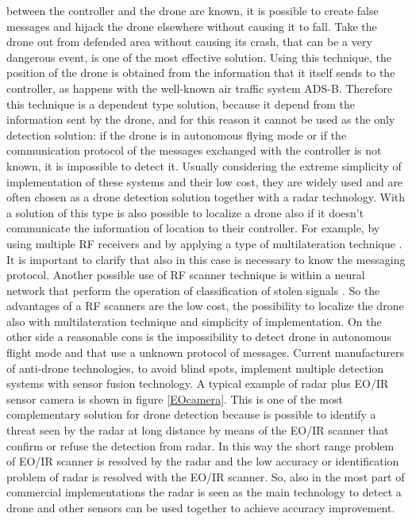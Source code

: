 between the controller and the drone are known, it is possible to create false messages and hijack the drone elsewhere without causing it to fall. Take the drone out from defended area without causing its crash, that can be a very dangerous event, is one of the most effective solution. Using this technique, the position of the drone is obtained from the information that it itself sends to the controller, as happens with the well-known air traffic system ADS-B. Therefore this technique is a dependent type solution, because it depend from the information sent by the drone, and for this reason it cannot be used as the only detection solution: if the drone is in autonomous flying mode or if the communication protocol of the messages exchanged with the controller is not known, it is impossible to detect it. Usually considering the extreme simplicity of implementation of these systems and their low cost, they are widely used and are often chosen as a drone detection solution together with a radar technology. With a solution of this type is also possible to localize a drone also if it doesn't communicate the information of location to their controller. For example, by using multiple RF receivers and by applying a type of multilateration technique \cite{survey}. It is important to clarify that also in this case is necessary to know the messaging protocol. Another possible use of RF scanner technique is within a neural network that perform the operation of classification of stolen signals \cite{survey}. So the advantages of a RF scanners are the low cost, the possibility to localize the drone also with multilateration technique and simplicity of implementation. On the other side a reasonable cons is the impossibility to detect drone in autonomous flight mode and that use a unknown protocol of messages. Current manufacturers of anti-drone technologies, to avoid blind spots, implement multiple detection systems with sensor fusion technology. A typical example of radar plus EO/IR sensor camera is shown in figure \ref{EOcamera}. This is one of the most complementary solution for drone detection because is possible to identify a threat seen by the radar at long distance by means of the EO/IR scanner that confirm or refuse the detection from radar. In this way the short range problem of EO/IR scanner is resolved by the radar and the low accuracy or identification problem of radar is resolved with the EO/IR scanner. So, also in the most part of commercial implementations the radar is seen as the main technology to detect  a drone and other sensors can be used together to achieve accuracy improvement.
